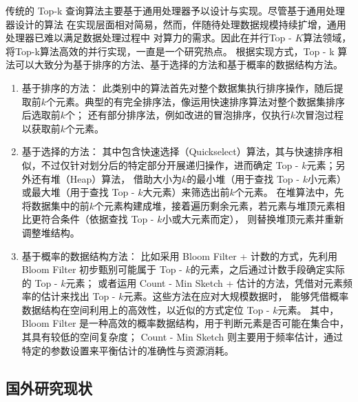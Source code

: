 传统的 Top-k 查询算法主要基于通用处理器予以设计与实现。尽管基于通用处理器设计的算法
在实现层面相对简易，然而，伴随待处理数据规模持续扩增，通用处理器已难以满足数据处理过程中
对算力的需求。因此在并行Top - $K$算法领域，将Top-k算法高效的并行实现，一直是一个研究热点。
根据实现方式，Top - k 算法可以大致分为基于排序的方法、基于选择的方法和基于概率的数据结构方法\cite{baidu2024topk}。
\begin{enumerate}
\item{基于排序的方法}：
此类别中的算法首先对整个数据集执行排序操作，随后提取前\(k\)个元素。典型的有完全排序法，像运用快速排序算法对整个数据集排序后选取前\(k\)个；
还有部分排序法，例如改进的冒泡排序，仅执行\(k\)次冒泡过程以获取前\(k\)个元素\cite{sedgewick1978implementing}。

\item{基于选择的方法}：
其中包含快速选择（Quickselect）算法，其与快速排序相似，不过仅针对划分后的特定部分开展递归操作，进而确定 Top - \(k\)元素\cite{martinez2001optimal}；另外还有堆（Heap）算法，
借助大小为\(k\)的最小堆（用于查找 Top - \(k\)小元素）或最大堆（用于查找 Top - \(k\)大元素）来筛选出前\(k\)个元素。
在堆算法中，先将数据集中的前\(k\)个元素构建成堆，接着遍历剩余元素，若元素与堆顶元素相比更符合条件（依据查找 Top - \(k\)小或大元素而定），
则替换堆顶元素并重新调整堆结构。

\item{基于概率的数据结构方法}：
比如采用 Bloom Filter + 计数的方式，先利用 Bloom Filter 初步甄别可能属于 Top - \(k\)的元素，之后通过计数手段确定实际的 Top - \(k\)元素；
或者运用 Count - Min Sketch + 估计的方法，凭借对元素频率的估计来找出 Top - \(k\)元素。这些方法在应对大规模数据时，
能够凭借概率数据结构在空间利用上的高效性，以近似的方式定位 Top - \(k\)元素。
其中，Bloom Filter 是一种高效的概率数据结构，用于判断元素是否可能在集合中，其具有较低的空间复杂度\cite{luo2018optimizing}；
Count - Min Sketch 则主要用于频率估计，通过特定的参数设置来平衡估计的准确性与资源消耗\cite{cormode2005improved}。 
\end{enumerate}

\subsection{国外研究现状}

